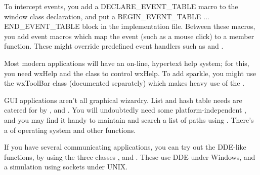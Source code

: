 To intercept events, you add a DECLARE\_EVENT\_TABLE macro to the window class declaration,
and put a BEGIN\_EVENT\_TABLE ... END\_EVENT\_TABLE block in the implementation file. Between these
macros, you add event macros which map the event (such as a mouse click) to a member function.
These might override predefined event handlers such as  and
\rtfsp{}.

Most modern applications will have an on-line, hypertext help system; for this, you
need wxHelp and the  class to control
wxHelp. To add sparkle, you might use the wxToolBar class (documented separately)
which makes heavy use of the .

GUI applications aren't all graphical wizardry. List and hash table needs are
catered for by ,  and .
You will undoubtedly need some platform-independent ,
and you may find it handy to maintain and search a list of paths using .
There's a  of operating system and other functions.

If you have several communicating applications, you can try out the DDE-like functions, by
using the three classes ,  and
\rtfsp{}. These use DDE under Windows, and a simulation using
sockets under UNIX.


